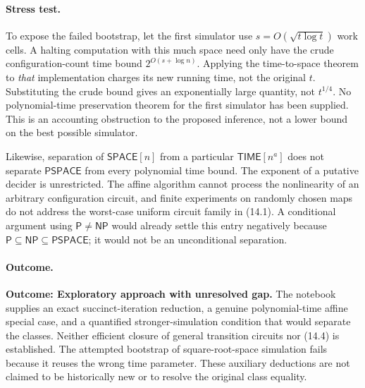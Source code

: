 \documentclass[11pt,a4paper]{article}
\begin{document}
\paragraph{Stress test.}
To expose the failed bootstrap, let the first simulator use
$s=O(\sqrt{t\log t})$ work cells. A halting computation with this much
space need only have the crude configuration-count time bound
$2^{O(s+\log n)}$. Applying the time-to-space theorem to \emph{that}
implementation charges its new running time, not the original $t$.
Substituting the crude bound gives an exponentially large quantity, not
$t^{1/4}$. No polynomial-time preservation theorem for the first
simulator has been supplied. This is an accounting obstruction to the
proposed inference, not a lower bound on the best possible simulator.

Likewise, separation of $\mathsf{SPACE}[n]$ from a particular
$\mathsf{TIME}[n^a]$ does not separate $\mathsf{PSPACE}$ from every
polynomial time bound. The exponent of a putative decider is unrestricted.
The affine algorithm cannot process the nonlinearity of an arbitrary
configuration circuit, and finite experiments on randomly chosen maps
do not address the worst-case uniform circuit family in (14.1).
A conditional argument using $\mathsf P\ne\mathsf{NP}$ would already
settle this entry negatively because
$\mathsf P\subseteq\mathsf{NP}\subseteq\mathsf{PSPACE}$; it would not
be an unconditional separation.

\paragraph{Outcome.}
\textbf{Outcome: Exploratory approach with unresolved gap.}
The notebook supplies an exact succinct-iteration reduction, a genuine
polynomial-time affine special case, and a quantified stronger-simulation
condition that would separate the classes. Neither efficient closure of
general transition circuits nor (14.4) is established. The attempted
bootstrap of square-root-space simulation fails because it reuses the
wrong time parameter. These auxiliary deductions are not claimed to be
historically new or to resolve the original class equality.
\end{document}
